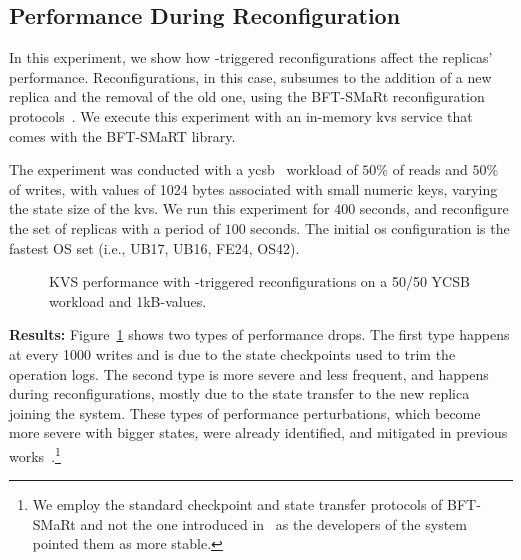 \subsection{Performance During Reconfiguration}
\label{sec:reconfiguration}



In this experiment, we show how \system-triggered reconfigurations affect the replicas' performance.
Reconfigurations, in this case, subsumes to the addition of a new replica and the removal of the old one, using the BFT-SMaRt reconfiguration protocols~\cite{Bessani2014}. 
We execute this experiment with an in-memory \gls{kvs} service that comes with the BFT-SMaRT library.

The experiment was conducted with a \gls{ycsb}~\cite{Cooper:2010} workload of $50\%$ of reads and $50\%$ of writes, with values of 1024 bytes associated with small numeric keys, varying the state size of the \gls{kvs}.
We run this experiment for $400$ seconds, and reconfigure the set of replicas with a period of $100$ seconds. 
The initial \gls{os} configuration is the fastest OS set (i.e., UB17, UB16, FE24, OS42).
\begin{figure}[h]
\caption{KVS performance with \system-triggered reconfigurations on a 50/50 YCSB workload and 1kB-values.}
\label{fig:reconfiguration}
\end{figure}



\textbf{Results:}
Figure~\ref{fig:reconfiguration} shows two types of performance drops.
The first type happens at every 1000 writes and is due to the state checkpoints used to trim the operation logs.
The second type is more severe and less frequent, and happens during reconfigurations, mostly due to the state transfer to the new replica joining the system.
These types of performance perturbations, which become more severe with bigger states, were already identified, and mitigated in previous works~\cite{Bessani:2013}.\footnote{We employ the standard checkpoint and state transfer protocols of BFT-SMaRt and not the one introduced in~\cite{Bessani:2013} as the developers of the system pointed them as more stable.} 

